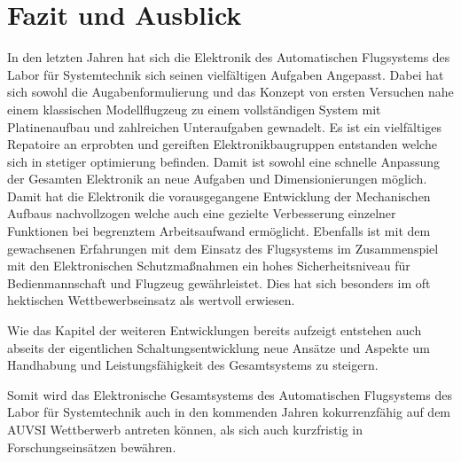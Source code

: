 \chapter{Fazit und Ausblick}\label{cha:Fazit und Ausblick}

In den letzten Jahren hat sich die Elektronik des Automatischen Flugsystems des Labor für Systemtechnik sich seinen vielfältigen Aufgaben Angepasst.
Dabei hat sich sowohl die Augabenformulierung und das Konzept von ersten Versuchen nahe einem klassischen Modellflugzeug zu einem vollständigen System mit  Platinenaufbau und zahlreichen Unteraufgaben gewnadelt. Es ist ein vielfältiges Repatoire an erprobten und gereiften Elektronikbaugruppen entstanden welche sich in stetiger optimierung befinden. Damit ist sowohl eine schnelle Anpassung der Gesamten Elektronik an neue Aufgaben und Dimensionierungen möglich.
Damit hat die Elektronik die vorausgegangene Entwicklung der Mechanischen Aufbaus nachvollzogen welche auch eine gezielte Verbesserung einzelner Funktionen bei begrenztem Arbeitsaufwand ermöglicht.
Ebenfalls ist mit dem gewachsenen Erfahrungen mit dem Einsatz des Flugsystems im Zusammenspiel mit den Elektronischen Schutzmaßnahmen ein hohes Sicherheitsniveau für Bedienmannschaft und Flugzeug gewährleistet. Dies hat sich besonders im oft hektischen Wettbewerbseinsatz als wertvoll erwiesen.

Wie das Kapitel der weiteren Entwicklungen bereits aufzeigt entstehen auch abseits der eigentlichen Schaltungsentwicklung neue Ansätze und Aspekte um Handhabung und Leistungsfähigkeit des Gesamtsystems zu steigern.

Somit wird das Elektronische Gesamtsystems des Automatischen Flugsystems des Labor für Systemtechnik auch in den kommenden Jahren kokurrenzfähig auf dem AUVSI Wettberwerb antreten können, als sich auch kurzfristig in Forschungseinsätzen bewähren.

